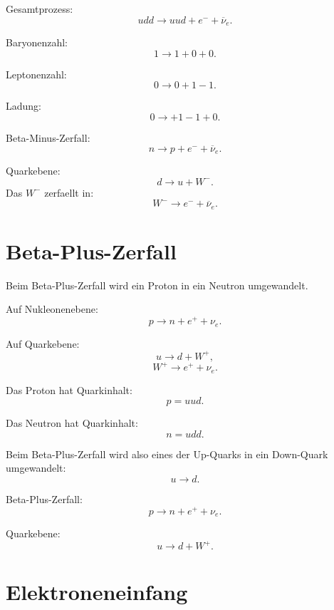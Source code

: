 \begin{examplebox}
Gesamtprozess:
\[
    udd
    \rightarrow
    uud + e^- + \overline{\nu}_e.
\]

Baryonenzahl:
\[
    1 \rightarrow 1+0+0.
\]

Leptonenzahl:
\[
    0 \rightarrow 0+1-1.
\]

Ladung:
\[
    0 \rightarrow +1-1+0.
\]
\end{examplebox}

\begin{examtipbox}
Beta-Minus-Zerfall:
\[
    n \rightarrow p + e^- + \overline{\nu}_e.
\]

Quarkebene:
\[
    d \rightarrow u + W^-.
\]
Das $W^-$ zerfaellt in:
\[
    W^- \rightarrow e^-+\overline{\nu}_e.
\]
\end{examtipbox}

\section{Beta-Plus-Zerfall}

Beim Beta-Plus-Zerfall wird ein Proton in ein Neutron umgewandelt.

\begin{formulabox}
Auf Nukleonenebene:
\[
    p \rightarrow n + e^+ + \nu_e.
\]
\end{formulabox}

\begin{formulabox}
Auf Quarkebene:
\[
    u \rightarrow d + W^+,
\]
\[
    W^+ \rightarrow e^+ + \nu_e.
\]
\end{formulabox}

\begin{conceptbox}
Das Proton hat Quarkinhalt:
\[
    p=uud.
\]

Das Neutron hat Quarkinhalt:
\[
    n=udd.
\]

Beim Beta-Plus-Zerfall wird also eines der Up-Quarks in ein Down-Quark umgewandelt:
\[
    u \rightarrow d.
\]
\end{conceptbox}

\begin{examtipbox}
Beta-Plus-Zerfall:
\[
    p \rightarrow n + e^+ + \nu_e.
\]

Quarkebene:
\[
    u \rightarrow d + W^+.
\]
\end{examtipbox}

\section{Elektroneneinfang}

